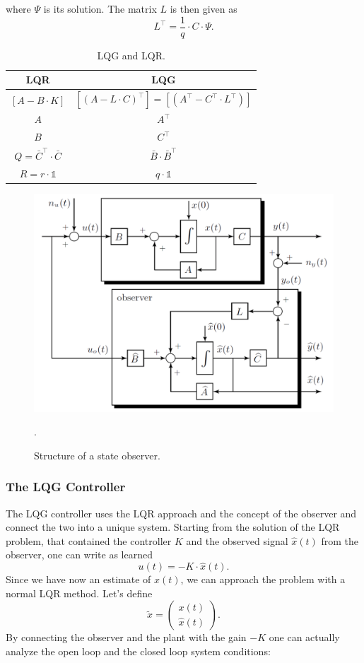 \documentclass[a4paper,12 pt]{article}
\numberwithin{equation}{section}
\theoremstyle{definition}
\theoremstyle{remark}
\theoremstyle{definition}
\theoremstyle{definition}
\theoremstyle{definition}
\theoremstyle{remark}
\begin{document}
where $\Psi$ is its solution. The matrix $L$ is then given as
\begin{equation}
L^\intercal=\frac{1}{q}\cdot C\cdot\Psi.
\end{equation}
\newpage
\begin{table}
\begin{center}\begin{tabular}{c|c} \toprule
LQR & LQG \\ \midrule
$[A-B\cdot K]$  & $[(A-L\cdot C)^\intercal]=[(A^\intercal-C^\intercal\cdot L^\intercal)]$ \\
$A$ & $A^\intercal$ \\
$B$ & $C^\intercal$ \\
$Q=\bar C^\intercal\cdot \bar C$  & $\bar B\cdot\bar B^\intercal$ \\
$R=r\cdot \mathbb{1}$  & $q\cdot \mathbb{1}$ \\ \bottomrule
\end{tabular}\end{center}
\caption{LQG and LQR.}
\label{table:LQG}
\end{table}


\begin{figure}[h]
\centering
\includegraphics[width=0.6\columnwidth]{lqg}
\caption{Structure of a state observer.}
\label{fig:lqg}.
\end{figure}


\subsubsection{The LQG Controller}
The LQG controller uses the LQR approach and the concept of the observer and connect the two into a unique system. Starting from the solution of the LQR problem, that contained the controller $K$ and the observed signal $\hat{x}(t)$ from the observer, one can write as learned
\begin{equation}
u(t)=-K\cdot \hat{x}(t).
\end{equation}
Since we have now an estimate of $x(t)$, we can approach the problem with a normal LQR method. Let's define
\begin{equation}
\tilde{x}=\begin{pmatrix} x(t) \\ \hat{x}(t)\end{pmatrix}.
\end{equation}
By connecting the observer and the plant with the gain $-K$ one can actually analyze the open loop and the closed loop system conditions:
\end{document}
